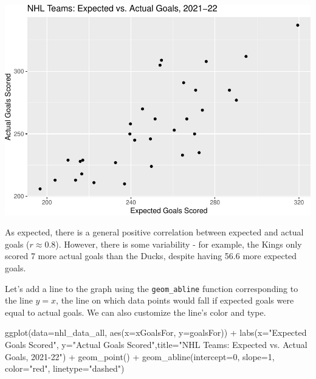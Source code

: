\documentclass[
]{book}
\newenvironment{Shaded}{\begin{snugshade}}{\end{snugshade}}
\newcommand{\AttributeTok}[1]{\textcolor[rgb]{0.77,0.63,0.00}{#1}}
\newcommand{\DecValTok}[1]{\textcolor[rgb]{0.00,0.00,0.81}{#1}}
\newcommand{\FunctionTok}[1]{\textcolor[rgb]{0.00,0.00,0.00}{#1}}
\newcommand{\NormalTok}[1]{#1}
\newcommand{\SpecialCharTok}[1]{\textcolor[rgb]{0.00,0.00,0.00}{#1}}
\newcommand{\StringTok}[1]{\textcolor[rgb]{0.31,0.60,0.02}{#1}}
\theoremstyle{definition}
\theoremstyle{definition}
\theoremstyle{definition}
\theoremstyle{definition}
\theoremstyle{remark}
\begin{document}
\includegraphics{series_files/figure-latex/hockey_ggplot3-1.pdf}

As expected, there is a general positive correlation between expected and actual goals (\(r \approx 0.8\)). However, there is some variability - for example, the Kings only scored 7 more actual goals than the Ducks, despite having 56.6 more expected goals.

Let's add a line to the graph using the \texttt{geom\_abline} function corresponding to the line \(y=x\), the line on which data points would fall if expected goals were equal to actual goals. We can also customize the line's color and type.

\begin{Shaded}
\begin{Highlighting}[]
\FunctionTok{ggplot}\NormalTok{(}\AttributeTok{data=}\NormalTok{nhl\_data\_all, }\FunctionTok{aes}\NormalTok{(}\AttributeTok{x=}\NormalTok{xGoalsFor, }\AttributeTok{y=}\NormalTok{goalsFor)) }\SpecialCharTok{+} \FunctionTok{labs}\NormalTok{(}\AttributeTok{x=}\StringTok{"Expected Goals Scored"}\NormalTok{, }\AttributeTok{y=}\StringTok{"Actual Goals Scored"}\NormalTok{,}\AttributeTok{title=}\StringTok{"NHL Teams: Expected vs. Actual Goals, 2021{-}22"}\NormalTok{) }\SpecialCharTok{+} \FunctionTok{geom\_point}\NormalTok{() }\SpecialCharTok{+} \FunctionTok{geom\_abline}\NormalTok{(}\AttributeTok{intercept=}\DecValTok{0}\NormalTok{, }\AttributeTok{slope=}\DecValTok{1}\NormalTok{, }\AttributeTok{color=}\StringTok{"red"}\NormalTok{, }\AttributeTok{linetype=}\StringTok{"dashed"}\NormalTok{)}
\end{Highlighting}
\end{Shaded}
\end{document}
